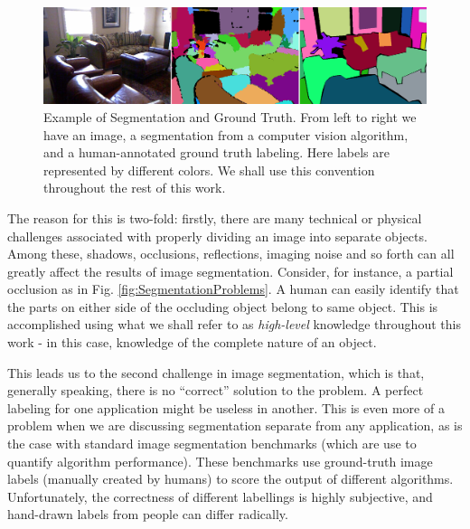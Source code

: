\begin{figure}
\label{fig:SegmentationExample}
\centering
\includegraphics[width=\linewidth]{figures/Introduction/segmentation_GT_example.png}
\caption[Example of Segmentation and Ground Truth]{Example of Segmentation and Ground Truth. From left to right we have an image, a segmentation from a computer vision algorithm, and a human-annotated ground truth labeling. Here labels are represented by different colors. We shall use this convention throughout the rest of this work.}
\end{figure}

The reason for this is two-fold: firstly, there are many technical or physical challenges associated with properly dividing an image into separate objects. Among these, shadows, occlusions, reflections, imaging noise and so forth can all greatly affect the results of image segmentation. Consider, for instance, a partial occlusion as in Fig. \ref{fig:SegmentationProblems}. A human can easily identify that the parts on either side of the occluding object belong to same object. This is accomplished using what we shall refer to as \emph{high-level} knowledge throughout this work - in this case, knowledge of the complete nature of an object. 

This leads us to the second challenge in image segmentation, which is that, generally speaking, there is no ``correct'' solution to the problem. A perfect labeling for one application might be useless in another. This is even more of a problem when we are discussing segmentation separate from any application, as is the case with standard image segmentation benchmarks (which are use to quantify algorithm performance). These benchmarks use ground-truth image labels (manually created by humans) to score the output of different algorithms. Unfortunately, the correctness of different labellings is highly subjective, and hand-drawn labels from  people can differ radically.

